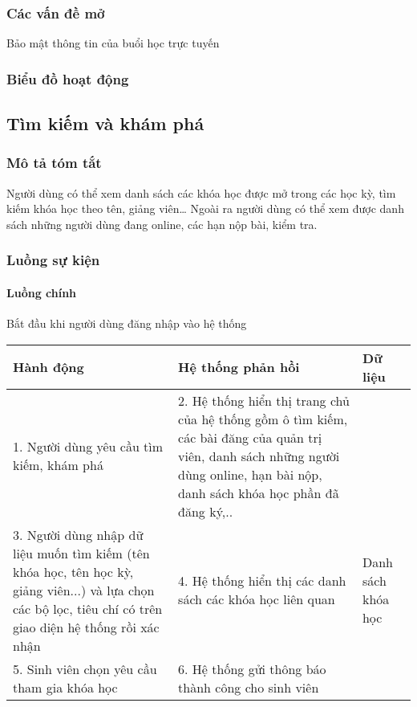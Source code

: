 \documentclass[./../main_file.tex]{subfiles}
\begin{document}
\subsubsection{Các vấn đề mở}
Bảo mật thông tin của buổi học trực tuyến

\subsubsection{Biểu đồ hoạt động}

\subsection{Tìm kiếm và khám phá}
\subsubsection{Mô tả tóm tắt}
Người dùng có thể xem danh sách các khóa học được mở trong các học kỳ, tìm kiếm khóa học theo tên, giảng viên… Ngoài ra người dùng có thể xem được danh sách những người dùng đang online, các hạn nộp bài, kiểm tra.

\subsubsection{Luồng sự kiện}
\paragraph{Luồng chính}
Bắt đầu khi người dùng đăng nhập vào hệ thống
\begin{longtable}{|p{}|p{}|p{}|}
		\hline
		\textbf{Hành động}                          & \textbf{Hệ thống phản hồi}                         & \textbf{Dữ liệu} \\ \hline
		1. Người dùng yêu cầu tìm kiếm, khám phá &
		2. Hệ thống hiển thị trang chủ của hệ thống gồm ô tìm kiếm, các bài đăng của quản trị viên, danh sách những người dùng online, hạn bài nộp, danh sách khóa học phần đã đăng ký,.. &
		\\ \hline
		3. Người dùng nhập dữ liệu muốn tìm kiếm (tên khóa học, tên học kỳ, giảng viên...) và lựa chọn các bộ lọc, tiêu chí có trên giao diện hệ thống rồi xác nhận &
		4. Hệ thống hiển thị các danh sách các khóa học liên quan &
		Danh sách khóa học \\ \hline
		5. Sinh viên chọn  yêu cầu tham gia khóa học & 6. Hệ thống gửi thông báo thành công cho sinh viên &                  \\ \hline
\end{longtable}
\end{document}
